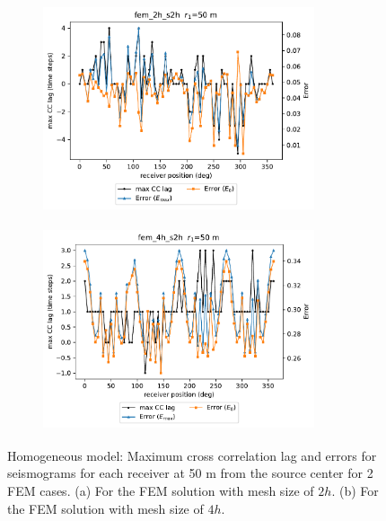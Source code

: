  \begin{figure}[h!]
 		\centering
		\begin{subfigure}{8cm}
				\includegraphics[width=8cm, height=6cm]{Thesis_Edith/figures/homo/homo_waves/Err_fem_2h_s2h_50m.pdf}
			     \caption{}
		\end{subfigure}
        \hspace{0.25cm}
		\begin{subfigure}{8cm}
				\includegraphics[width=8cm, height=6cm]{Thesis_Edith/figures/homo/homo_waves/Err_fem_4h_s2h_50m.pdf}
			   \caption{}
		\end{subfigure}
 
	\caption{Homogeneous model: Maximum cross correlation lag and errors for seismograms for each receiver at 50 m from the source center for 2 FEM cases. (a) For the FEM solution with mesh size of $2h$. (b) For the FEM solution with mesh size of $4h$.}  
	\label{fig:3.11}
\end{figure}

